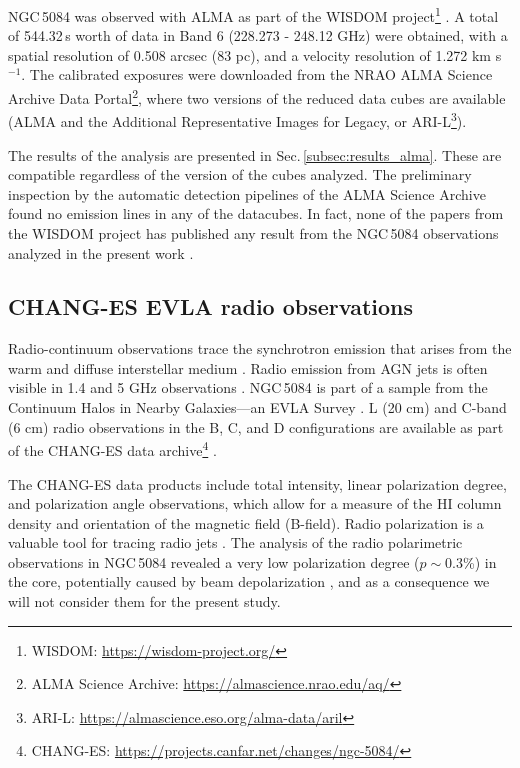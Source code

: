 \documentclass[modern]{aastex631}
\begin{document}
NGC\,5084 was observed with ALMA as part of the WISDOM project\footnote{WISDOM: \url{https://wisdom-project.org/}} \citep[Project code: 2015.1.00598.S, PI: Martin Bureau,][]{onishi+2017mnras468_4663}. A total of 544.32\,s worth of data in Band 6 (228.273 - 248.12 GHz) were obtained, with a spatial resolution of 0.508 arcsec (83 pc), and a velocity resolution of 1.272 km s$^{-1}$. The calibrated exposures were downloaded from the NRAO ALMA Science Archive Data Portal\footnote{ALMA Science Archive: \url{https://almascience.nrao.edu/aq/}}, where two versions of the reduced data cubes are available (ALMA and the Additional Representative Images for Legacy, or ARI-L\footnote{ARI-L: \url{https://almascience.eso.org/alma-data/aril}}).

The results of the analysis are presented in Sec.\,\ref{subsec:results_alma}. These are compatible regardless of the version of the cubes analyzed. The preliminary inspection by the automatic detection pipelines of the ALMA Science Archive found no emission lines in any of the datacubes. In fact, none of the papers from the WISDOM project has published any result from the NGC\,5084 observations analyzed in the present work \citep{smith+2021mnras500_1933, davis+2022mnras512_1522}. 

\subsection{CHANG-ES EVLA radio observations} 
\label{subsec:data_radiopol}

Radio-continuum observations trace the synchrotron emission that arises from the warm and diffuse interstellar medium \citep{beck+2013inbook_641}. Radio emission from AGN jets is often visible in 1.4 and 5 GHz observations \citep[20 cm and 6 cm]{sebastian+2019apj883_189, hardcastle+2020na88_101539}. NGC\,5084 is part of a sample from the Continuum Halos in Nearby Galaxies—an EVLA Survey \citep[CHANG-ES][]{irwin+2012aj144_43}. L (20 cm) and C-band (6 cm) radio observations in the B, C, and D configurations are available as part of the CHANG-ES data archive\footnote{CHANG-ES: \url{https://projects.canfar.net/changes/ngc-5084/}} \citep{wiegert+2015aj150_81, irwin+2019aj158_21}. 

The CHANG-ES data products include total intensity, linear polarization degree, and polarization angle observations, which allow for a measure of the HI column density and orientation of the magnetic field (B-field). Radio polarization is a valuable tool for tracing radio jets \citep{pasetto+2018aap613_74, sebastian+2020mnras499_334}. 
The analysis of the radio polarimetric observations in NGC\,5084 revealed a very low polarization degree ($p\sim0.3$\%) in the core, potentially caused by beam depolarization \citep{haverkorn+2004aap421_1011, pasetto+2018aap613_74}, and as a consequence we will not consider them for the present study.
\end{document}
